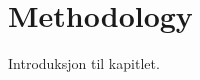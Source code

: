 \documentclass[../../main.tex]{subfiles}
\begin{document}

\chapter{Methodology}

Introduksjon til kapitlet.

\end{document}
